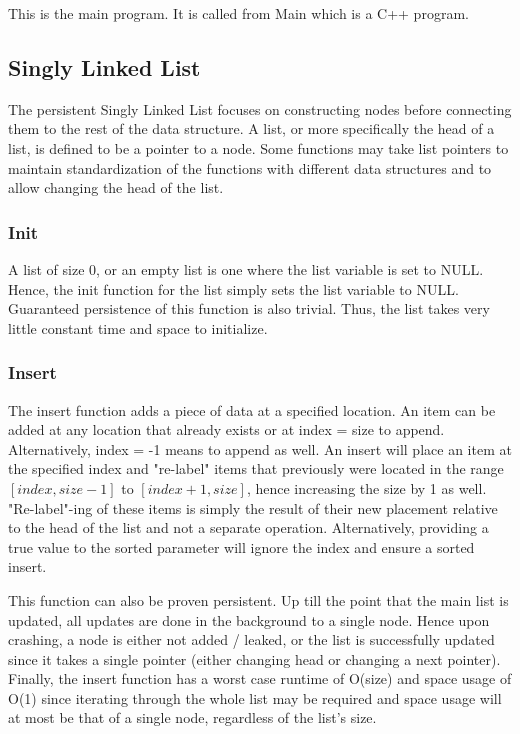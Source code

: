 \documentclass[twocolumn]{article}
\begin{document}
This is the main program. It is called from Main which is a C++ program.

\subsection{Singly Linked List}

The persistent Singly Linked List focuses on constructing nodes before
connecting them to the rest of the data structure. A list, or more specifically
the head of a list, is defined to be a pointer to a node. Some functions may
take list pointers to maintain standardization of the functions with different
data structures and to allow changing the head of the list.

\subsubsection{Init}

A list of size 0, or an empty list is one where the list variable is set to
NULL. Hence, the init function for the list simply sets the list variable to
NULL. Guaranteed persistence of this function is also trivial. Thus, the list
takes very little constant time and space to initialize.

\subsubsection{Insert}

The insert function adds a piece of data at a specified location. An item can be
added at any location that already exists or at index = size to append.
Alternatively, index = -1 means to append as well. An insert will place an item
at the specified index and "re-label" items that previously were located in the
range $[index,size-1]$ to $[index+1,size]$, hence increasing the size by 1 as
well. "Re-label"-ing of these items is simply the result of their new placement
relative to the head of the list and not a separate operation. Alternatively,
providing a true value to the sorted parameter will ignore the index and ensure
a sorted insert.

This function can also be proven persistent. Up till the point that the main
list is updated, all updates are done in the background to a single node. Hence
upon crashing, a node is either not added / leaked, or the list is successfully
updated since it takes a single pointer (either changing head or changing a next
pointer). Finally, the insert function has a worst case runtime of O(size) and
space usage of O(1) since iterating through the whole list may be required and
space usage will at most be that of a single node, regardless of the list's
size.
\end{document}
